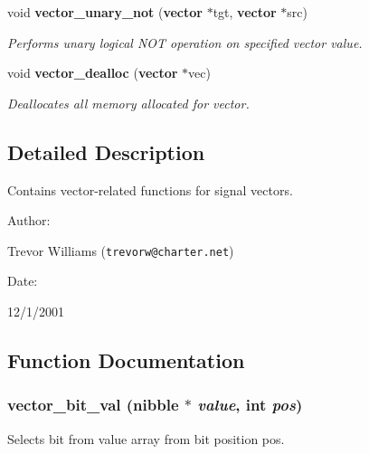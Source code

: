 \begin{CompactItemize}
void {\bf vector\_\-unary\_\-not} ({\bf vector} $\ast$tgt, {\bf vector} $\ast$src)
\begin{CompactList}\small\item\em Performs unary logical NOT operation on specified vector value.\item\end{CompactList}\item 
void {\bf vector\_\-dealloc} ({\bf vector} $\ast$vec)
\begin{CompactList}\small\item\em Deallocates all memory allocated for vector.\item\end{CompactList}\end{CompactItemize}


\subsection{Detailed Description}
Contains vector-related functions for signal vectors.



\begin{Desc}
\item[Author: ]\par
Trevor Williams ({\tt trevorw@charter.net}) \end{Desc}
\begin{Desc}
\item[Date: ]\par
12/1/2001\end{Desc}


\subsection{Function Documentation}
\subsubsection{ vector\_\-bit\_\-val ({\bf nibble} $\ast$ {\em value}, int {\em pos})}\label{vector_8h_a10}


Selects bit from value array from bit position pos.

